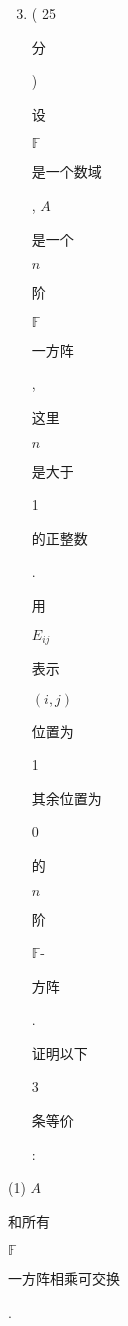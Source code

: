 \documentclass[10pt]{article}
\begin{document}
\begin{enumerate}
  \setcounter{enumi}{2}
  \item ( 25 \begin{CJK}{UTF8}{mj}分\end{CJK}) \begin{CJK}{UTF8}{mj}设\end{CJK} $\mathbb{F}$ \begin{CJK}{UTF8}{mj}是一个数域\end{CJK}, $A$ \begin{CJK}{UTF8}{mj}是一个\end{CJK} $n$ \begin{CJK}{UTF8}{mj}阶\end{CJK} $\mathbb{F}$ \begin{CJK}{UTF8}{mj}一方阵\end{CJK}, \begin{CJK}{UTF8}{mj}这里\end{CJK} $n$ \begin{CJK}{UTF8}{mj}是大于\end{CJK} 1 \begin{CJK}{UTF8}{mj}的正整数\end{CJK}. \begin{CJK}{UTF8}{mj}用\end{CJK} $E_{i j}$ \begin{CJK}{UTF8}{mj}表示\end{CJK} $(i, j)$ \begin{CJK}{UTF8}{mj}位置为\end{CJK} 1 \begin{CJK}{UTF8}{mj}其余位置为\end{CJK} 0 \begin{CJK}{UTF8}{mj}的\end{CJK} $n$ \begin{CJK}{UTF8}{mj}阶\end{CJK} $\mathbb{F}$-\begin{CJK}{UTF8}{mj}方阵\end{CJK}. \begin{CJK}{UTF8}{mj}证明以下\end{CJK} 3 \begin{CJK}{UTF8}{mj}条等价\end{CJK}:
\end{enumerate}
(1) $A$ \begin{CJK}{UTF8}{mj}和所有\end{CJK} $\mathbb{F}$ \begin{CJK}{UTF8}{mj}一方阵相乘可交换\end{CJK}.
\end{document}
